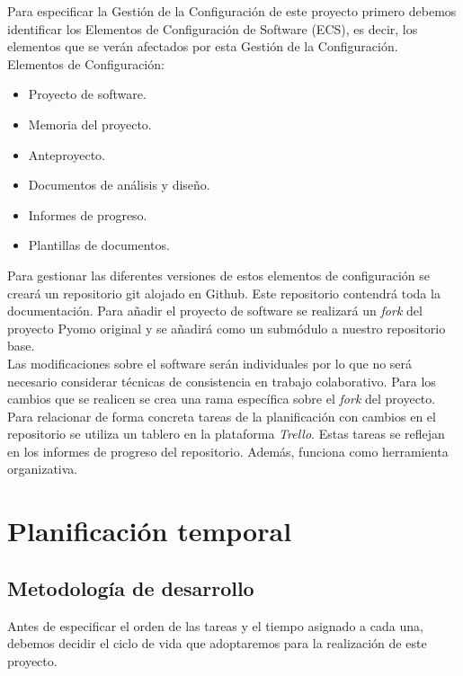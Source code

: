 Para especificar la Gestión de la Configuración de este proyecto primero debemos identificar los Elementos de Configuración de Software (ECS), es decir, los elementos que se verán afectados por esta Gestión de la Configuración.\\

Elementos de Configuración:
\begin{itemize}
    \item Proyecto de software.
    \item Memoria del proyecto.
    \item Anteproyecto.
    \item Documentos de análisis y diseño.
    \item Informes de progreso.
    \item Plantillas de documentos.
\end{itemize}

Para gestionar las diferentes versiones de estos elementos de configuración se creará un repositorio git alojado en Github. Este repositorio contendrá toda la documentación. Para añadir el proyecto de software se realizará un \textit{fork} del proyecto Pyomo original y se añadirá como un submódulo a nuestro repositorio base. \\

Las modificaciones sobre el software serán individuales por lo que no será necesario considerar técnicas de consistencia en trabajo colaborativo. Para los cambios que se realicen se crea una rama específica sobre el \textit{fork} del proyecto.\\

Para relacionar de forma concreta tareas de la planificación con cambios en el repositorio se utiliza un tablero en la plataforma \textit{Trello}. Estas tareas se reflejan en los informes de progreso del repositorio. Además, funciona como herramienta organizativa.

\section{Planificación temporal}

\subsection{Metodología de desarrollo}

Antes de especificar el orden de las tareas y el tiempo asignado a cada una, debemos decidir el ciclo de vida que adoptaremos para la realización de este proyecto. \\

